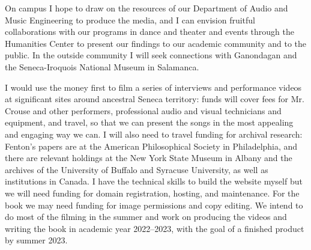 \documentclass[12pt]{article}
\begin{document}
On campus I hope to draw on the resources of our Department of Audio and Music
Engineering to produce the media, and I can envision fruitful collaborations
with our programs in dance and theater and events through the Humanities
Center to present our findings to our academic community and to the public.
In the outside community I will seek connections with Ganondagan and the
Seneca-Iroquois National Museum in Salamanca.

I would use the money first to film a series of interviews and performance
videos at significant sites around ancestral Seneca territory: funds will
cover fees for Mr. Crouse and other performers, professional audio and visual
technicians and equipment, and travel, so that we can present the songs in the
most appealing and engaging way we can.
I will also need to travel funding for archival research: Fenton's papers
are at the American Philosophical Society in Philadelphia, and there are
relevant holdings at the New York State Museum in Albany and the archives of
the University of Buffalo and Syracuse University, as well as institutions in
Canada.
I have the technical skills to build the website myself but we will need
funding for domain registration, hosting, and maintenance.
For the book we may need funding for image permissions and copy editing.
We intend to do most of the filming in the summer and work on producing the
videos and writing the book in academic year 2022--2023, with the goal of a
finished product by summer 2023.
\end{document}
